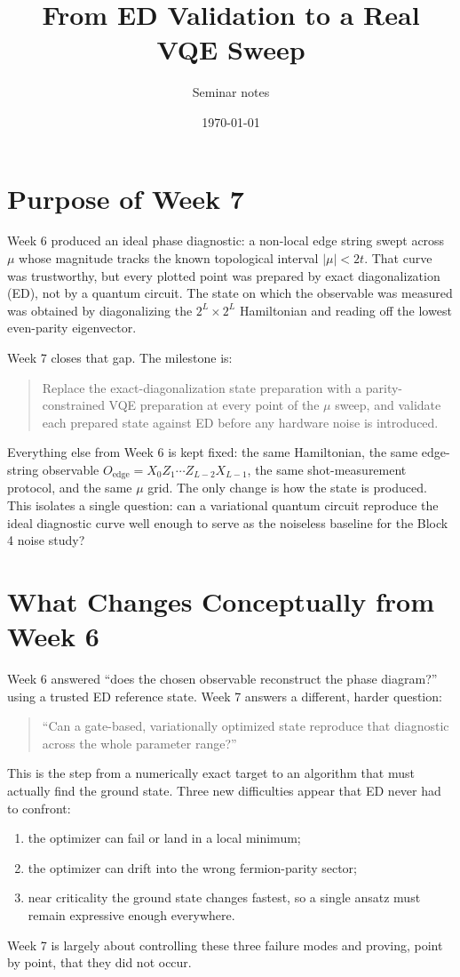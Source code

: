 \documentclass[11pt]{article}
\title{From ED Validation to a Real VQE Sweep}
\author{Seminar notes}
\date{\today}
\newcommand{\Oedge}{X_0 Z_1\cdots Z_{L-2} X_{L-1}}
\begin{document}
\maketitle

\section{Purpose of Week 7}

Week 6 produced an ideal phase diagnostic: a non-local edge string swept across $\mu$ whose magnitude tracks the known topological interval $|\mu|<2t$. That curve was trustworthy, but every plotted point was prepared by exact diagonalization (ED), not by a quantum circuit. The state on which the observable was measured was obtained by diagonalizing the $2^L\times 2^L$ Hamiltonian and reading off the lowest even-parity eigenvector.

Week 7 closes that gap. The milestone is:
\begin{quote}
  Replace the exact-diagonalization state preparation with a parity-constrained VQE preparation at every point of the $\mu$ sweep, and validate each prepared state against ED before any hardware noise is introduced.
\end{quote}

Everything else from Week 6 is kept fixed: the same Hamiltonian, the same edge-string observable $O_{\mathrm{edge}}=\Oedge$, the same shot-measurement protocol, and the same $\mu$ grid. The only change is how the state is produced. This isolates a single question: can a variational quantum circuit reproduce the ideal diagnostic curve well enough to serve as the noiseless baseline for the Block 4 noise study?

\section{What Changes Conceptually from Week 6}

Week 6 answered ``does the chosen observable reconstruct the phase diagram?'' using a trusted ED reference state. Week 7 answers a different, harder question:
\begin{quote}
  ``Can a gate-based, variationally optimized state reproduce that diagnostic across the whole parameter range?''
\end{quote}

This is the step from a numerically exact target to an algorithm that must actually find the ground state. Three new difficulties appear that ED never had to confront:
\begin{enumerate}
  \item the optimizer can fail or land in a local minimum;
  \item the optimizer can drift into the wrong fermion-parity sector;
  \item near criticality the ground state changes fastest, so a single ansatz must remain expressive enough everywhere.
\end{enumerate}
Week 7 is largely about controlling these three failure modes and proving, point by point, that they did not occur.
\end{document}

